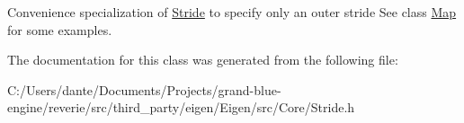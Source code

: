 Convenience specialization of \mbox{\hyperlink{class_eigen_1_1_stride}{Stride}} to specify only an outer stride See class \mbox{\hyperlink{class_eigen_1_1_map}{Map}} for some examples. 

The documentation for this class was generated from the following file\+:\begin{DoxyCompactItemize}
\item 
C\+:/\+Users/dante/\+Documents/\+Projects/grand-\/blue-\/engine/reverie/src/third\+\_\+party/eigen/\+Eigen/src/\+Core/Stride.\+h\end{DoxyCompactItemize}
